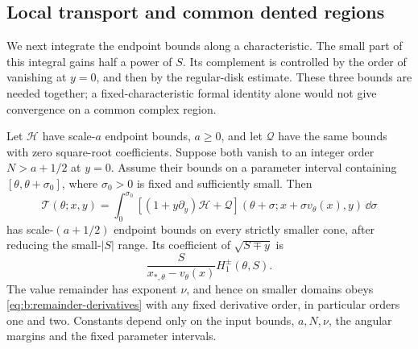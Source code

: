 \subsection{Local transport and common dented regions}
\label{subsec:b:local-transport}

We next integrate the endpoint bounds along a characteristic. The
small part of this integral gains half a power of $S$. Its complement
is controlled by the order of vanishing at $y=0$, and then by the
regular-disk estimate. These three bounds are needed together; a
fixed-characteristic formal identity alone would not give convergence
on a common complex region.

\begin{lmm}\label{lmm:b:local-transport}
Let $\mathcal H$ have scale-$a$ endpoint bounds, $a\geq0$, and
let $\mathcal Q$ have the same bounds with zero square-root
coefficients. Suppose both vanish to an integer order
$N>a+1/2$ at $y=0$. Assume their bounds on a parameter interval
containing $[\theta,\theta+\sigma_0]$, where $\sigma_0>0$ is fixed
and sufficiently small. Then
\begin{equation}\label{eq:b:local-transport}
 \mathcal T(\theta;x,y)
 =\int_0^{\sigma_0}
       [(1+y\partial_y)\mathcal H+\mathcal Q]
       (\theta+\sigma;x+\sigma v_\theta(x),y)\,\dd\sigma
\end{equation}
has scale-$(a+1/2)$ endpoint bounds on every strictly smaller cone,
after reducing the small-$|S|$ range. Its coefficient of
$\sqrt{S\mp y}$ is
\begin{equation}\label{eq:b:transport-endpoint-coefficient}
 \frac{S}{x_{*,\theta}-v_\theta(x)}H_1^\pm(\theta,S).
\end{equation}
The value remainder has exponent $\nu$, and hence on smaller
domains obeys \eqref{eq:b:remainder-derivatives} with any fixed
derivative order, in particular orders one and two. Constants depend
only on the input bounds, $a,N,\nu$, the angular margins and the
fixed parameter intervals.
\end{lmm}
